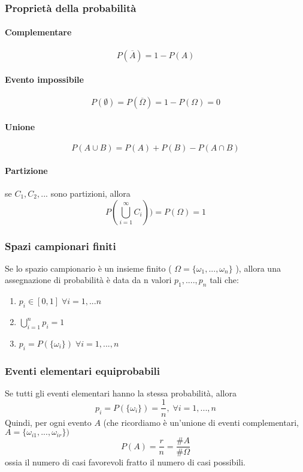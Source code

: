\documentclass{article}
\begin{document}
\subsubsection{Proprietà della probabilità}
\paragraph{Complementare\\}
\begin{equation}
  P(\overline{A}) = 1 - P(A)
\end{equation}
\paragraph{Evento impossibile\\}
\begin{equation}
  P(\emptyset) = P(\overline{\Omega}) = 1 - P(\Omega) = 0
\end{equation}
\paragraph{Unione\\}
\begin{equation}
  P({A}\cup{B}) = P(A) + P(B) - P({A}\cap{B})
\end{equation}
\paragraph{Partizione\\}
se $C_1,C_2,...$ sono partizioni, allora
\begin{equation}
  P(\bigcup_{i=1}^{\infty}C_i)) = P(\Omega) = 1
\end{equation}
\subsubsection{Spazi campionari finiti}
Se lo spazio campionario è un insieme finito ( $\Omega = \{\omega_1,...,\omega_n \}$ ), allora una assegnazione di probabilità è data da n valori $p_1, ...., p_n$ tali che:
\begin{enumerate}
\item $p_i \in [0,1]\; \forall{i=1,...n}$
\item $\bigcup_{i=1}^{n}p_i = 1$
\item $p_i = P(\{\omega_i\})\; \forall{i=1,...,n}$
\end{enumerate}
\subsubsection{Eventi elementari equiprobabili}
Se tutti gli eventi elementari hanno la stessa probabilità, allora
\begin{equation}
  p_i = P(\{\omega_i\}) = \frac{1}{n}, \; \forall{i=1,...,n}
\end{equation}
Quindi, per ogni evento $A$ (che ricordiamo è un'unione di eventi complementari, $A=\{\omega_{i1}, ..., \omega_{ir}\})$
\begin{equation}
  P(A)= \frac{r}{n} = \frac{\# A}{\# \Omega}
\end{equation}
ossia il numero di casi favorevoli fratto il numero di casi possibili.
\end{document}
